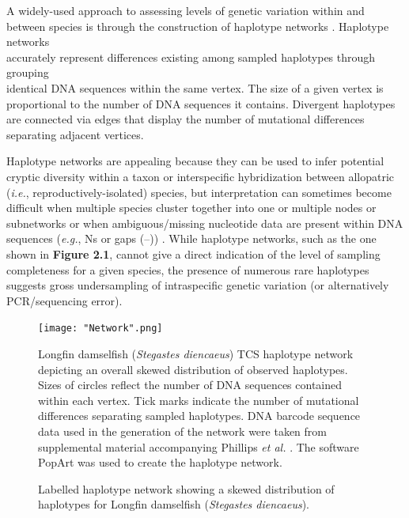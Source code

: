 A widely-used approach to assessing levels of genetic variation within and between species is through the construction of haplotype networks \cite{templeton1992cladistic}. Haplotype networks \\ accurately represent differences existing among sampled haplotypes through grouping \\ identical DNA sequences within the same vertex. The size of a given vertex is proportional to the number of DNA sequences it contains.  Divergent haplotypes are connected via edges that display the number of mutational differences separating adjacent vertices.

\vspace{5mm} 

Haplotype networks are appealing because they can be used to infer potential cryptic diversity within a taxon or interspecific hybridization between allopatric \\ (\textit{i.e.}, reproductively-isolated) species, but interpretation can sometimes become difficult when multiple species cluster together into one or multiple nodes or subnetworks \cite{hanner2011dna, hart2007things, wong2009identifying} or when ambiguous/missing nucleotide data are present within DNA sequences (\textit{e.g.}, Ns or gaps (--)) \cite{joly2007haplotype}. While haplotype networks, such as the one shown in 
\textbf{Figure 2.1}, cannot give a direct indication of the level of sampling completeness for a given species, the presence of numerous rare haplotypes suggests gross undersampling of intraspecific genetic variation (or alternatively PCR/sequencing error).

\begin{figure}[H]

\centering

\texttt{[image: "Network".png]}

\caption{Labelled haplotype network showing a skewed distribution of haplotypes for Longfin damselfish (\textit{Stegastes diencaeus}).}{Longfin damselfish (\textit{Stegastes diencaeus}) TCS \cite{templeton1992cladistic} haplotype network depicting an overall skewed distribution of observed haplotypes. Sizes of circles reflect the number of DNA sequences contained within each vertex. Tick marks indicate the number of mutational differences separating sampled haplotypes. DNA barcode sequence data used in the generation of the network were taken from supplemental material accompanying Phillips \textit{et al.} \cite{phillips2015exploration}. The software PopArt \cite{leigh2015popart} was used to create the haplotype network.}

\end{figure}

